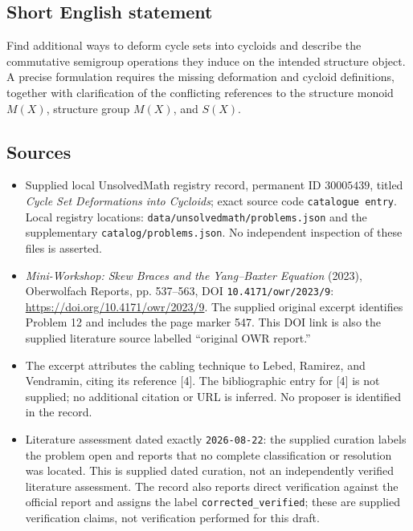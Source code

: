 \documentclass[11pt]{article}
\begin{document}
\subsection{Short English statement}
Find additional ways to deform cycle sets into cycloids and describe the commutative semigroup operations they induce on the intended structure object. A precise formulation requires the missing deformation and cycloid definitions, together with clarification of the conflicting references to the structure monoid \(M(X)\), structure group \(M(X)\), and \(S(X)\).
\subsection{Sources}
\begin{itemize}
\item Supplied local UnsolvedMath registry record, permanent ID \(30005439\), titled \emph{Cycle Set Deformations into Cycloids}; exact source code \texttt{catalogue entry}. Local registry locations: \texttt{data/unsolvedmath/problems.json} and the supplementary \texttt{catalog/problems.json}. No independent inspection of these files is asserted.
\item \emph{Mini-Workshop: Skew Braces and the Yang--Baxter Equation} (2023), Oberwolfach Reports, pp. 537--563, DOI \texttt{10.4171/owr/2023/9}: \url{https://doi.org/10.4171/owr/2023/9}. The supplied original excerpt identifies Problem 12 and includes the page marker 547. This DOI link is also the supplied literature source labelled ``original OWR report.''
\item The excerpt attributes the cabling technique to Lebed, Ramirez, and Vendramin, citing its reference [4]. The bibliographic entry for [4] is not supplied; no additional citation or URL is inferred. No proposer is identified in the record.
\item Literature assessment dated exactly \texttt{2026-08-22}: the supplied curation labels the problem open and reports that no complete classification or resolution was located. This is supplied dated curation, not an independently verified literature assessment. The record also reports direct verification against the official report and assigns the label \texttt{corrected\_verified}; these are supplied verification claims, not verification performed for this draft.
\end{itemize}
\end{document}
